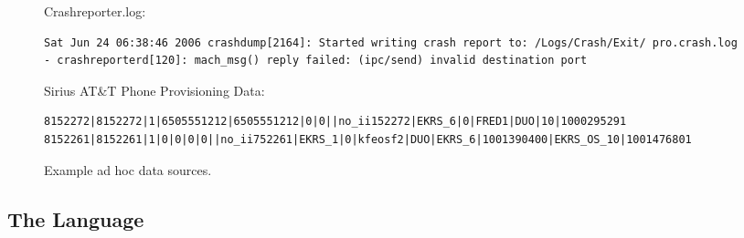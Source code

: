 \begin{figure*}
Crashreporter.log:
{\small \begin{verbatim}
Sat Jun 24 06:38:46 2006 crashdump[2164]: Started writing crash report to: /Logs/Crash/Exit/ pro.crash.log
- crashreporterd[120]: mach_msg() reply failed: (ipc/send) invalid destination port
\end{verbatim}
}

Sirius AT\&T Phone Provisioning Data:
{\small \begin{verbatim}
8152272|8152272|1|6505551212|6505551212|0|0||no_ii152272|EKRS_6|0|FRED1|DUO|10|1000295291
8152261|8152261|1|0|0|0|0||no_ii752261|EKRS_1|0|kfeosf2|DUO|EKRS_6|1001390400|EKRS_OS_10|1001476801
\end{verbatim}
}



\caption {Example ad hoc data sources.} \shrink
\label{fig:example}
\end{figure*}




\subsection{The Language}

